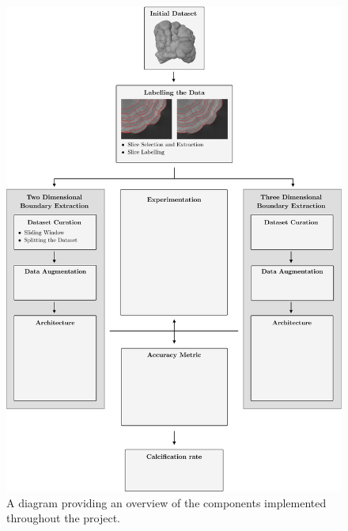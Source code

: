 \begin{figure}[!p]
    \centering
    \includegraphics[width=\textwidth]{images/overview.pdf}
    \caption{A diagram providing an overview of the components implemented throughout the project.}
    \label{fig:overview}
\end{figure}

